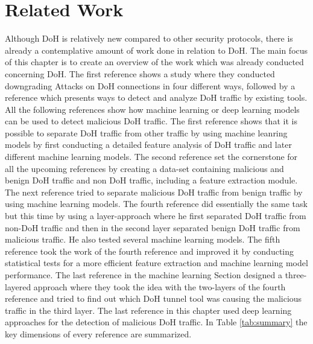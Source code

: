 \chapter{Related Work} \label{related_work}
Although DoH is relatively new compared to other security protocols, there is already a contemplative amount of work done in relation to DoH. The main focus of this chapter is to create an overview of the work which was already conducted concerning DoH. The first reference shows a study where they conducted downgrading Attacks on DoH connections in four different ways, followed by a reference which presents ways to detect and analyze DoH traffic by existing tools. All the following references show how machine learning or deep learning models can be used to detect malicious DoH traffic. The first reference shows that it is possible to separate DoH traffic from other traffic by using machine leanring models by first conducting a detailed feature analysis of DoH traffic and later different machine learning models. The second reference set the cornerstone for all the upcoming references by creating a data-set containing malicious and benign DoH traffic and non DoH traffic, including a feature extraction module. The next reference tried to separate malicious DoH traffic from benign traffic by using machine learning models. The fourth reference did essentially the same task but this time by using a layer-approach where he first separated DoH traffic from non-DoH traffic and then in the second layer separated benign DoH traffic from malicious traffic. He also tested several machine learning models. The fifth reference took the work of the fourth reference and improved it by conducting statistical tests for a more efficient feature extraction and machine learning model performance. The last reference in the machine learning Section designed a three-layered approach where they took the idea with the two-layers of the fourth reference and tried to find out which DoH tunnel tool was causing the malicious traffic in the third layer. The last reference in this chapter used deep learning approaches for the detection of malicious DoH traffic. In Table \ref{tab:summary} the key dimensions of every reference are summarized.

